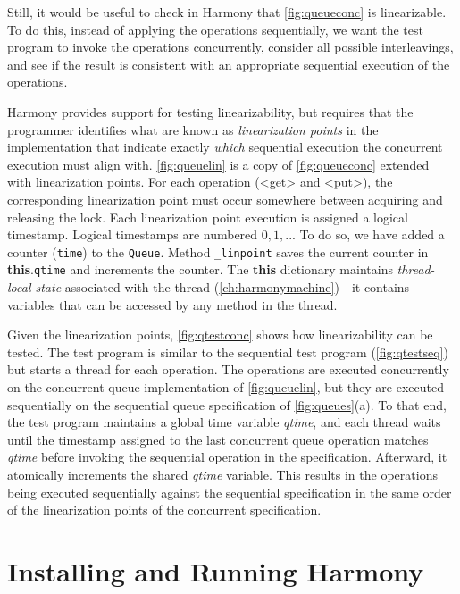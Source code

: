 \documentclass{report}
\begin{document}
Still, it would be useful to check in Harmony that
\autoref{fig:queueconc} is linearizable.
To do this, instead of applying the operations sequentially,
we want the test program to invoke the operations concurrently,
consider all possible interleavings, and see if the result
is consistent with an appropriate sequential execution of the
operations.

%
Harmony provides support for testing linearizability,
but requires that the programmer
identifies what are known as \emph{linearization points}
in the implementation that indicate exactly \emph{which} sequential
execution the concurrent execution must align with.
\autoref{fig:queuelin} is a copy of \autoref{fig:queueconc} extended with
linearization points.
For each operation (<{get}> and <{put}>), the corresponding
linearization point must occur somewhere between acquiring and releasing
the lock.
%
Each linearization point execution is assigned a logical timestamp.
Logical timestamps are numbered $0, 1, ...$
To do so, we have added a counter (\texttt{time}) to the \texttt{Queue}.
Method \texttt{\_linpoint} saves the current counter in
\textbf{this}.\texttt{qtime} and increments the counter.
The \textbf{this} dictionary maintains \emph{thread-local state} associated
with the thread (\autoref{ch:harmonymachine})---it contains variables that
can be accessed by any method in the thread.

Given the linearization points, \autoref{fig:qtestconc} shows how
linearizability can be tested.
The test program is similar to the sequential test program
(\autoref{fig:qtestseq}) but starts a thread for each operation.
The operations are executed concurrently on the concurrent queue
implementation of \autoref{fig:queuelin}, but they are executed sequentially
on the sequential queue specification of \autoref{fig:queues}(a).
To that end, the test program maintains a global time variable
\textit{qtime}, and each thread waits until the timestamp assigned to
the last concurrent queue operation matches \textit{qtime} before invoking
the sequential operation in the specification.
Afterward, it atomically increments the shared \textit{qtime} variable.
This results in the operations being executed sequentially against the
sequential specification in the same order of the linearization points
of the concurrent specification.

\chapter{Installing and Running Harmony}\label{app:install}
\end{document}
